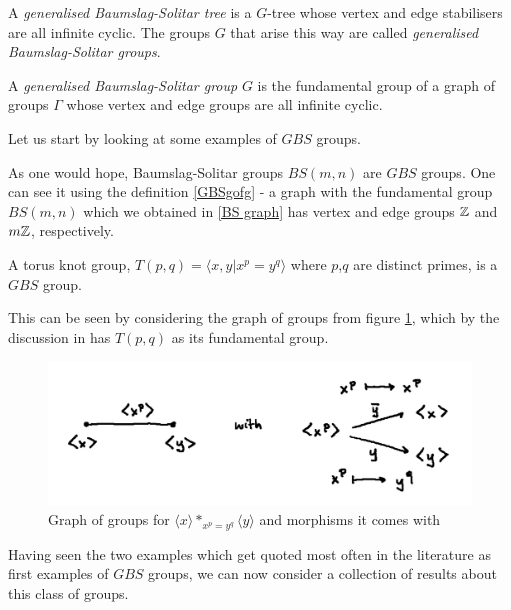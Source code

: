 \begin{definition}\cite{For03}
    A \emph{generalised Baumslag-Solitar tree} is a $G$-tree whose vertex and edge stabilisers are all infinite cyclic. The groups $G$ that arise this way are called \emph{generalised Baumslag-Solitar groups}.
\end{definition}

\begin{definition}\cite{Le07}\label{GBSgofg}
    A \emph{generalised Baumslag-Solitar group} $G$ is the fundamental group of a graph of groups $\Gamma$ whose vertex and edge groups are all infinite cyclic.
\end{definition}

Let us start by looking at some examples of $GBS$ groups.

\begin{example}
    As one would hope, Baumslag-Solitar groups $BS(m,n)$ are $GBS$ groups. One can see it using the definition \ref{GBSgofg} -  a graph with the fundamental group $BS(m,n)$ which we obtained in \ref{BS graph} has vertex and edge groups $\mathbb{Z}$ and $m\mathbb{Z}$, respectively.
\end{example}

\begin{example} 
    A torus knot group, $T(p,q) = \langle x,y | x^p = y^q \rangle$ where $p$,$q$ are distinct primes, is a $GBS$ group.

    This can be seen by considering the graph of groups from figure \ref{T(p,q) graph}, which by the discussion in \cite{Jo23} has $T(p,q)$ as its fundamental group.
\end{example}

\begin{figure}[h]
    \centering
    \includegraphics[width=0.5\linewidth]{sections/alicja/Graph for T(p,q).jpeg}
    \caption{Graph of groups for $\langle x \rangle \ast_{x^p = y^q} \langle y \rangle$ and morphisms it comes with} 
    \label{T(p,q) graph}
\end{figure}

Having seen the two examples which get quoted most often in the literature as first examples of $GBS$ groups, we can now consider a collection of results about this class of groups.

